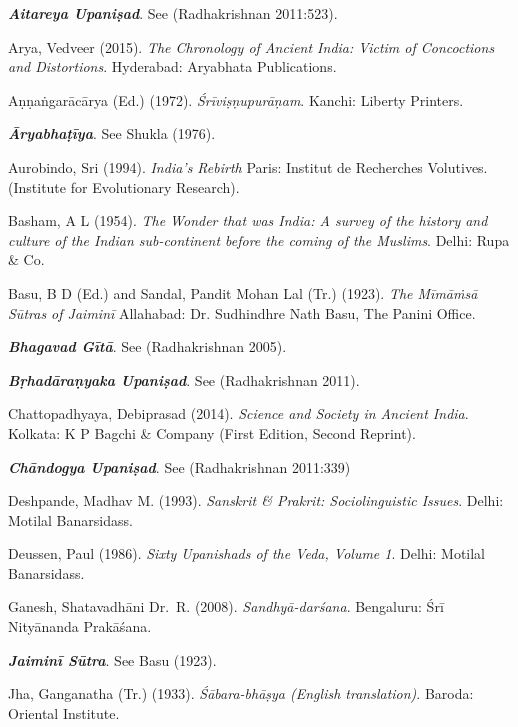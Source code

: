 \begin{thebibliography}{99}
\itemsep=1pt
{{\sl\bfseries Aitareya Upaniṣad}}. See (Radhakrishnan 2011:523).

Arya, Vedveer (2015). {\sl The Chronology of Ancient India: Victim of Concoctions and Distortions}. Hyderabad: Aryabhata Publications.

Aṇṇaṅgarācārya (Ed.) (1972). {\sl Śrīviṣṇupurāṇam}. Kanchi: Liberty Printers. 

{{\sl\bfseries Āryabhaṭīya}}. See Shukla (1976).

Aurobindo, Sri (1994). {\sl India’s Rebirth} Paris: Institut de Recherches Volutives. (Institute for Evolutionary Research).

Basham, A L (1954). {\sl The Wonder that was India: A survey of the history and culture of the Indian sub-continent before the coming of the Muslims}. Delhi: Rupa \& Co.

Basu, B D (Ed.) and Sandal, Pandit Mohan Lal (Tr.) (1923). {\sl The Mīmāṁsā Sūtras of Jaiminī} Allahabad: Dr. Sudhindhre Nath Basu, The Panini Office.

{{\sl\bfseries Bhagavad Gītā}}. See (Radhakrishnan 2005).

{\sl\bfseries Bṛhadāraṇyaka Upaniṣad}. See (Radhakrishnan 2011).

Chattopadhyaya, Debiprasad (2014). {\sl Science and Society in Ancient India}. Kolkata: K P Bagchi \& Company (First Edition, Second Reprint).

{\sl\bfseries Chāndogya Upaniṣad}. See (Radhakrishnan 2011:339)

Deshpande, Madhav M. (1993). {\sl Sanskrit \& Prakrit: Sociolinguistic Issues}. Delhi: Motilal Banarsidass.

Deussen, Paul (1986). {\sl Sixty Upanishads of the Veda, Volume 1}. Delhi: Motilal Banarsidass.

Ganesh, Shatavadhāni Dr.\ R. (2008). {\sl Sandhyā-darśana}. Bengaluru: Śrī Nityānanda Prakāśana.

{{\sl\bfseries Jaiminī Sūtra}}. See Basu (1923).

Jha, Ganganatha (Tr.) (1933). {\sl Śābara-bhāṣya (English translation)}. Baroda: Oriental Institute.


\end{thebibliography}
